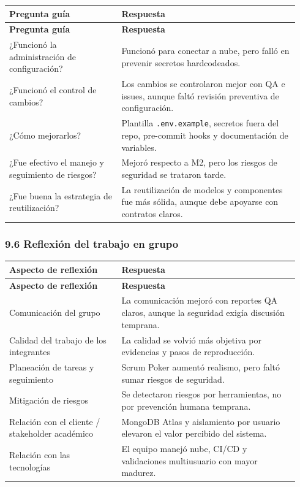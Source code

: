 \documentclass[11pt,a4paper]{article}
\begin{document}
\begingroup
\small
\setlength{\tabcolsep}{3pt}
\begin{longtable}{P{0.36\linewidth}P{0.58\linewidth}}
\toprule
\textbf{Pregunta guía} & \textbf{Respuesta} \\
\midrule
\endfirsthead
\toprule
\textbf{Pregunta guía} & \textbf{Respuesta} \\
\midrule
\endhead
\bottomrule
\endlastfoot
¿Funcionó la administración de configuración? & Funcionó para conectar a nube, pero falló en prevenir secretos hardcodeados. \\
¿Funcionó el control de cambios? & Los cambios se controlaron mejor con QA e issues, aunque faltó revisión preventiva de configuración. \\
¿Cómo mejorarlos? & Plantilla \texttt{.env.example}, secretos fuera del repo, pre-commit hooks y documentación de variables. \\
¿Fue efectivo el manejo y seguimiento de riesgos? & Mejoró respecto a M2, pero los riesgos de seguridad se trataron tarde. \\
¿Fue buena la estrategia de reutilización? & La reutilización de modelos y componentes fue más sólida, aunque debe apoyarse con contratos claros. \\
\end{longtable}
\endgroup

\subsubsection{9.6 Reflexión del trabajo en grupo}

\begingroup
\small
\setlength{\tabcolsep}{3pt}
\begin{longtable}{P{0.36\linewidth}P{0.58\linewidth}}
\toprule
\textbf{Aspecto de reflexión} & \textbf{Respuesta} \\
\midrule
\endfirsthead
\toprule
\textbf{Aspecto de reflexión} & \textbf{Respuesta} \\
\midrule
\endhead
\bottomrule
\endlastfoot
Comunicación del grupo & La comunicación mejoró con reportes QA claros, aunque la seguridad exigía discusión temprana. \\
Calidad del trabajo de los integrantes & La calidad se volvió más objetiva por evidencias y pasos de reproducción. \\
Planeación de tareas y seguimiento & Scrum Poker aumentó realismo, pero faltó sumar riesgos de seguridad. \\
Mitigación de riesgos & Se detectaron riesgos por herramientas, no por prevención humana temprana. \\
Relación con el cliente / stakeholder académico & MongoDB Atlas y aislamiento por usuario elevaron el valor percibido del sistema. \\
Relación con las tecnologías & El equipo manejó nube, CI/CD y validaciones multiusuario con mayor madurez. \\
\end{longtable}
\endgroup
\end{document}
